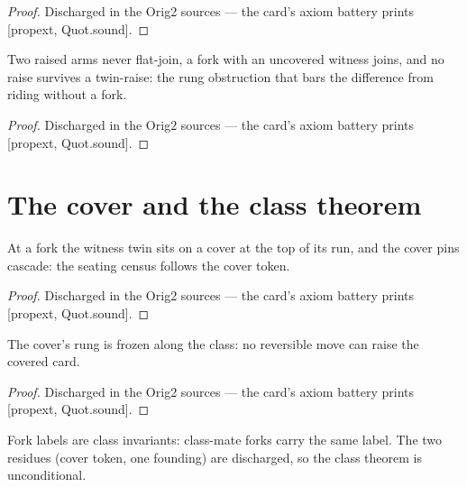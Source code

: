 \begin{proof}
\leanok
Discharged in the Orig2 sources --- the card's axiom battery prints [propext, Quot.sound].
\end{proof}

\begin{theorem}\label{thm:rungObstruction}
\leanok
{}
Two raised arms never flat-join, a fork with an uncovered witness
joins, and no raise survives a twin-raise: the rung obstruction
that bars the difference from riding without a fork.
\end{theorem}

\begin{proof}
\leanok
Discharged in the Orig2 sources --- the card's axiom battery prints [propext, Quot.sound].
\end{proof}

\section{The cover and the class theorem}

\begin{theorem}\label{thm:cover}
\leanok
{}
At a fork the witness twin sits on a cover at the top of its run,
and the cover pins cascade: the seating census follows the cover
token.
\end{theorem}

\begin{proof}
\leanok
Discharged in the Orig2 sources --- the card's axiom battery prints [propext, Quot.sound].
\end{proof}

\begin{theorem}\label{thm:coverRung}
\leanok
{}
The cover's rung is frozen along the class: no reversible move
can raise the covered card.
\end{theorem}

\begin{proof}
\leanok
Discharged in the Orig2 sources --- the card's axiom battery prints [propext, Quot.sound].
\end{proof}

\begin{theorem}\label{thm:forkLabelClass}
\leanok
{}
Fork labels are class invariants: class-mate forks carry the same
label.  The two residues (cover token, one founding) are
discharged, so the class theorem is unconditional.
\end{theorem}

